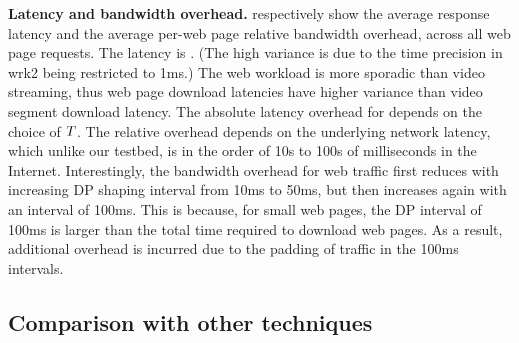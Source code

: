 \textbf{Latency and bandwidth overhead.}
%
 respectively show the
average response latency and the average per-web page relative bandwidth
overhead, across all web page requests.
The {\base} latency is . (The high variance is due to
the time precision in wrk2 being restricted to 1ms.)
The web workload is more sporadic than video streaming, thus web page download
latencies have higher variance than video segment download latency.
The absolute latency overhead for {\ns} depends on the choice of $T$. The
relative overhead depends on the underlying network latency, which unlike our
testbed, is in the order of 10s to 100s of milliseconds in the Internet.
%
Interestingly, the bandwidth overhead for web traffic first reduces with
increasing DP shaping interval from 10ms to 50ms, but then increases again
with an interval of 100ms. This is because, for small web pages, the DP interval
of 100ms is larger than the total time required to download web pages. As a
result, additional overhead is incurred due to the padding of traffic in the
100ms intervals.

\subsection{Comparison with other techniques}\label{subsec:eval-comparison}
%
%


